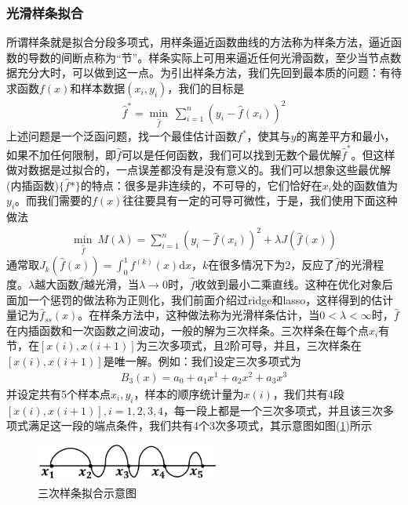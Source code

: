         \subsubsection{光滑样条拟合}
            \par
            所谓样条就是拟合分段多项式，用样条逼近函数曲线的方法称为样条方法，逼近函数的导数的间断点称为“节”。样条实际上可用来逼近任何光滑函数，至少当节点数据充分大时，可以做到这一点。为引出样条方法，我们先回到最本质的问题：有待求函数$f(x)$和样本数据$(x_i,y_i)$，我们的目标是
            \begin{align*}
            \hat{f}^* = \min_{\hat{f}} \ \sum_{i=1}^n(y_i - \hat{f}(x_i))^2
            \end{align*}
            上述问题是一个泛函问题，找一个最佳估计函数$f^*$，使其与$y$的离差平方和最小，如果不加任何限制，即$\hat{f}$可以是任何函数，我们可以找到无数个最优解$\hat{f}^*$。但这样做对数据是过拟合的，一点误差都没有是没有意义的。我们可以想象这些最优解(内插函数)$\{\hat{f}*\}$的特点：很多是非连续的，不可导的，它们恰好在$x_i$处的函数值为$y_i$。而我们需要的$f(x)$往往要具有一定的可导可微性，于是，我们使用下面这种做法
            \begin{align*}
            \min_{\hat{f}} \ M(\lambda) = \sum_{i=1}^n(y_i-\hat{f}(x_i))^2 + \lambda J(\hat{f}(x))
            \end{align*}
            通常取$J_k(\hat{f}(x)) = \int_0^1f^{(k)}(x)\mathrm{d}x$，$k$在很多情况下为2，反应了$\hat{f}$的光滑程度。$\lambda$越大函数$\hat{f}$越光滑，当$\lambda\rightarrow 0$时，$\hat{f}$收敛到最小二乘直线。这种在优化对象后面加一个惩罚的做法称为正则化，我们前面介绍过ridge和lasso，这样得到的估计量记为$\hat{f}_{ss}(x)$。在样条方法中，这种做法称为光滑样条估计，当$0< \lambda < \infty$时，$\hat{f}$在内插函数和一次函数之间波动，一般的解为三次样条。三次样条在每个点$x_i$有节，在$[x(i),x(i+1)]$为三次多项式，且2阶可导，并且，三次样条在$[x(i),x(i+1)]$是唯一解。例如：我们设定三次多项式为
            \begin{align*}
            B_3(x) = a_0+a_1x^1+a_2x^2+a_3x^3
            \end{align*}
            并设定共有5个样本点$x_i,y_i$，样本的顺序统计量为$x(i)$，我们共有4段$[x(i),x(i+1)],i = 1,2,3,4$，每一段上都是一个三次多项式，并且该三次多项式满足这一段的端点条件，我们共有4个3次多项式，其示意图如图(\ref{fig:三次样条拟合示意图})所示
            \begin{figure}[H]
            \centering
            \includegraphics[width=6cm]{images/cubic_spline_fitting.jpg}
            \caption{三次样条拟合示意图}
            \label{fig:三次样条拟合示意图}
            \end{figure}
